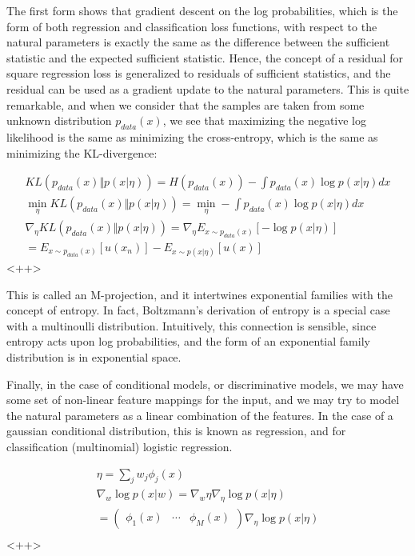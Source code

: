 \documentclass[a4paper]{article}
\begin{document}
The first form shows that gradient descent on the log probabilities, which is the form of both regression and classification loss functions, with respect to the natural parameters is exactly the same as the difference between the sufficient statistic and the expected sufficient statistic. 
Hence, the concept of a residual for square regression loss is generalized to residuals of sufficient statistics, and the residual can be used as a gradient update to the natural parameters. 
This is quite remarkable, and when we consider that the samples are taken from some unknown distribution $p_{data}(x)$, we see that maximizing the negative log likelihood is the same as minimizing the cross-entropy, which is the same as minimizing the KL-divergence:

\begin{equation}
  \begin{split}
    KL\left( p_{data}(x) \Vert p(x \vert \eta) \right) = H\left( p_{data}(x) \right) - \int p_{data}(x) \log p(x \vert \eta) dx \\
    \min_{\eta} KL\left( p_{data}(x) \Vert p(x \vert \eta) \right) = \min_{\eta} - \int p_{data}(x) \log p(x \vert \eta) dx \\
    \nabla_{\eta} KL\left( p_{data}(x) \Vert p(x \vert \eta) \right) = \nabla_{\eta} E_{x \sim p_{data}(x)} \left[ - \log p(x \vert \eta) \right] \\
    = E_{x \sim p_{data}(x)} \left[ u(x_n) \right] - E_{x \sim p(x \vert \eta) } \left[ u(x) \right]
  \end{split}
  \label{<++>}
\end{equation}<++>

This is called an M-projection, and it intertwines exponential families with the concept of entropy. 
In fact, Boltzmann's derivation of entropy is a special case with a multinoulli distribution. 
Intuitively, this connection is sensible, since entropy acts upon log probabilities, and the form of an exponential family distribution is in exponential space.

Finally, in the case of conditional models, or discriminative models, we may have some set of non-linear feature mappings for the input, and we may try to model the natural parameters as a linear combination of the features. 
In the case of a gaussian conditional distribution, this is known as regression, and for classification (multinomial) logistic regression. 

\begin{equation}
  \begin{split}
    \eta = \sum_j w_j \phi_j(x) \\
    \nabla_w \log p(x \vert w) = \nabla_w \eta \nabla_{\eta} \log p(x \vert \eta) \\
    = \begin{pmatrix} \phi_1(x) & \cdots & \phi_M(x) \end{pmatrix} \nabla_{\eta} \log p(x \vert \eta) \\
  \end{split}
  \label{<++>}
\end{equation}<++>
\end{document}
